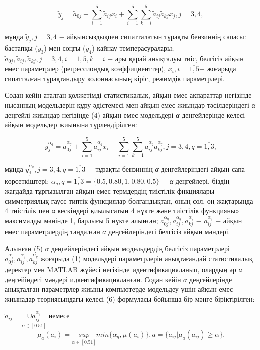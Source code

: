 \begin{equation}
\tilde{y}_j=\tilde{a}_{0j}+\sum_{i=1}^5\tilde{a}_{ij}x_i+\sum_{i=1}^5\sum_{k=i}^5\tilde{a}_{ij}\tilde{a}_{kj}x_j,j=3,4,
\end{equation}

мұнда $\tilde{y}_j,j=3,4$ − айқынсыздықпен сипатталатын
тұрақты бензиннің сапасы: бастапқы ($\tilde{y}_3$)
мен соңғы ($\tilde{y}_4$) қайнау темперасуралары;
$\tilde{a}_{0j},\tilde{a}_{ij},\tilde{a}_{kj},j=3,4,i=1,5,k=i$
− ары қарай анықталуы тиіс, белгісіз
айқын емес параметрлер (регрессиондық коэффициенттер),
$x_i,i=\overline{1,5}$− жоғарыда сипатталған тұрақтандыру
колоннасының кіріс, режимдік параметрлері.

Содан кейін аталған қолжетімді статистикалық, айқын емес ақпараттар
негізінде нысанның модельдерін құру әдістемесі мен айқын емес жиындар
тәсілдеріндегі \emph{α} деңгейлі жиындар негізінде (4) айқын емес
модельдері \emph{α} деңгейлерінде келесі айқын модельдер жиынына
түрлендірілген:

\begin{equation}
y_j^{\alpha_q}=a_{0j}^{\alpha_q}+\sum_{i=1}^5a_{ij}^{\alpha_q}x_i+\sum_{i=1}^5\sum_{k=1}^5a_{ij}^{\alpha_q}a_{kj}^{\alpha_q},j=3,4,q=\overline{1,3},
\end{equation}

мұнда $y_j^{\alpha_q},j=3,4,q=\overline{1,3}$ − тұрақты
бензиннің \emph{α} деңгейлеріндегі айқын сапа көрсеткіштері;
$\alpha_q,q=\overline{1,3}=\{0.5,0.80,1,0.80,0.5\}$ − \emph{α}
деңгейлері, біздің жағдайда тұрғызылған айқын емес термдердің
тиістілік фнкциялары симметриялық гаусс типтік функциялар
болғандықтан, оның сол, оң жақтарында 4 тиістілік пен α кескіндері
қиылысатын 4 нүкте және тиістілік функцияны» максималды мәнінде 1,
барлығы 5 нүкте алынған;
$a_{0j}^{\alpha_q},a_{ij}^{\alpha_q},a_{kj}^{\alpha_q}$ −
$a_{ij}^{\alpha_q}$ − айқын емес параметрлердің таңдалған
\emph{α} деңгейлеріндегі белгісіз айқын мәндері.

Алынған (5) \emph{α} деңгейлеріндегі айқын модельдердің белгісіз
параметрлері $a_{0j}^{\alpha_q},a_{ij}^{\alpha_q},a_{kj}^{\alpha_q}$
жоғарыда (1) модельдері параметрлерін анықтағандай статистикалық
деректер мен MATLAB жүйесі негізінде идентификацияланып, олардың
әр \emph{α} деңгейіндегі мәндері идкентификацияланған. Содан
кейін \emph{α} деңгейлерінде анықталған параметрлер жиыны компьютерде
модельдеу үшін айқын емес жиынадар теориясындағы келесі (6) формуласы
бойынша бір мәнге біріктірілген:

$\tilde{a}_{ij}=\underset{\alpha \in [0.51]}{\cup a_{ij}^{\alpha_q}}$ немесе
\begin{equation}
\mu_{\tilde{a}}(a_i)=\underset{\alpha \in [0.51]}{sup}min\{\alpha_q,\mu(a_i)\},a=\{\tilde{a}_{ij}|\mu_{\tilde{a}}(a_{ij})\geq \alpha\}.
\end{equation}

